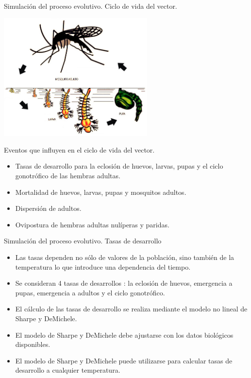 
\begin{frame}[c]{Simulación del proceso evolutivo. Ciclo de vida del vector.}
\begin{center}
    \includegraphics[width=7.8cm]{./graphics/ciclo-de-vida.jpg}
\end{center}
\end{frame}


\begin{frame}[c]{Eventos que influyen en el ciclo de vida del vector.}
  \begin{itemize}
    \item Tasas de desarrollo para la eclosión de huevos, larvas, pupas y el ciclo gonotrófico de las hembras adultas.
    \item Mortalidad de huevos, larvas, pupas y mosquitos adultos.
    \item Dispersión de adultos.
    \item Ovipostura de hembras adultas nulíperas y paridas.
  \end{itemize}
\end{frame}

\begin{frame}[c]{Simulación del proceso evolutivo. Tasas de desarrollo}
  \begin{itemize}
    \item Las tasas dependen no sólo de valores de la población, sino también de la temperatura lo que introduce una dependencia del tiempo.
    \item Se consideran 4 tasas de desarrollos : la eclosión de huevos, emergencia a pupas, emergencia a adultos y el ciclo gonotrófico.
    \item El cálculo de las tasas de desarrollo se realiza mediante el modelo no lineal de Sharpe y DeMichele.
    \item El modelo de Sharpe y DeMichele debe ajustarse con los datos biológicos disponibles.
    \item El modelo de Sharpe y DeMichele puede utilizarse para calcular tasas de desarrollo a cualquier temperatura.
  \end{itemize}
\end{frame}


